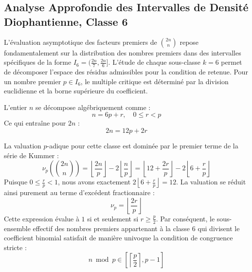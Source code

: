 \documentclass[12pt,a4paper]{article}
\begin{document}
    \newpage
    \subsection{Analyse Approfondie des Intervalles de Densité Diophantienne, Classe 6}
    L'évaluation asymptotique des facteurs premiers de $\binom{2n}{n}$ repose fondamentalement sur la distribution des nombres premiers dans des intervalles spécifiques de la forme $I_6 = (\frac{2n}{7}, \frac{2n}{6}]$.
    L'étude de chaque sous-classe $k = 6$ permet de décomposer l'espace des résidus admissibles pour la condition de retenue.
    Pour un nombre premier $p \in I_6$, le multiple critique est déterminé par la division euclidienne et la borne supérieure du coefficient.

    L'entier $n$ se décompose algébriquement comme :
    \begin{equation}
    n = 6 p + r, \quad 0 \le r < p
    \end{equation}
    Ce qui entraîne pour $2n$ :
    \begin{equation}
    2n = 12 p + 2r
    \end{equation}

    La valuation $p$-adique pour cette classe est dominée par le premier terme de la série de Kummer :
    \begin{equation}
    \nu_p\left( \binom{2n}{n} \right) = \left\lfloor \frac{2n}{p} \right\rfloor - 2 \left\lfloor \frac{n}{p} \right\rfloor = \left\lfloor 12 + \frac{2r}{p} \right\rfloor - 2 \left\lfloor 6 + \frac{r}{p} \right\rfloor
    \end{equation}
    Puisque $0 \le \frac{r}{p} < 1$, nous avons exactement $2 \left\lfloor 6 + \frac{r}{p} \right\rfloor = 12$.
    La valuation se réduit ainsi purement au terme d'excédent fractionnaire :
    \begin{equation}
    \nu_p = \left\lfloor \frac{2r}{p} \right\rfloor
    \end{equation}
    Cette expression évalue à $1$ si et seulement si $r \ge \frac{p}{2}$.
    Par conséquent, le sous-ensemble effectif des nombres premiers appartenant à la classe $6$ qui divisent le coefficient binomial satisfait de manière univoque la condition de congruence stricte :
    \begin{equation}
    n \bmod p \in \left[ \left\lceil \frac{p}{2} \right\rceil, p - 1 \right]
    \end{equation}
\end{document}
